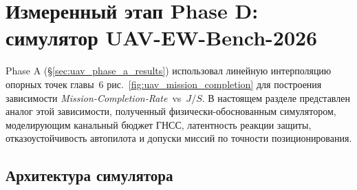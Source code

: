 %
%
%

\section{Измеренный этап Phase D: симулятор UAV-EW-Bench-2026}
\label{sec:uav_phase_d}

Phase A (\S\ref{sec:uav_phase_a_results}) использовал линейную
интерполяцию опорных точек главы~6 рис.~\ref{fig:uav_mission_completion}
для построения зависимости \emph{Mission-Completion-Rate}~vs~$J/S$.
В настоящем разделе представлен  аналог этой зависимости,
полученный физически-обоснованным симулятором, моделирующим
канальный бюджет ГНСС, латентность реакции защиты, отказоустойчивость
автопилота и допуски миссий по точности позиционирования.

\subsection{Архитектура симулятора}
\label{sec:uav_phase_d_arch}

